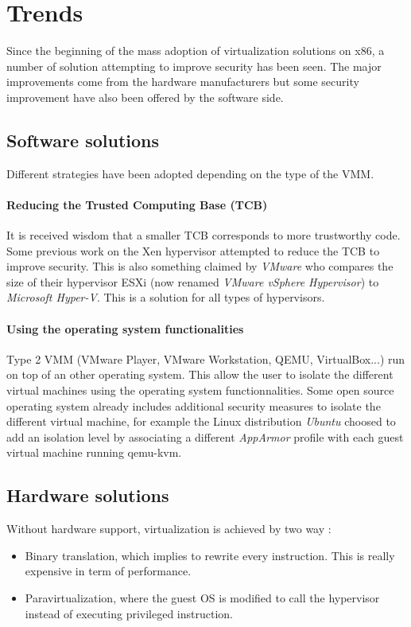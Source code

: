 \newpage
\section{Trends}
Since the beginning of the mass adoption of virtualization solutions on x86, a
number of solution attempting to improve security has been seen.
The major improvements come from the hardware manufacturers but some 
security improvement have also been offered by the software side.

\subsection{Software solutions}
Different strategies have been adopted depending on the type of the VMM.

\paragraph{Reducing the Trusted Computing Base (TCB)}
It is received wisdom that a smaller TCB corresponds to more trustworthy code.
Some previous work on the Xen\cite{xen} hypervisor attempted to reduce the
TCB\cite{xen-disaggregation} to
improve security.
This is also something claimed by \emph{VMware}\cite{vmware-footprint} who
compares the size of their hypervisor ESXi (now renamed \emph{VMware vSphere
Hypervisor}) to \emph{Microsoft Hyper-V}.
This is a solution for all types of hypervisors.

\paragraph{Using the operating system functionalities}
Type 2 VMM (VMware Player, VMware Workstation, QEMU, VirtualBox...) run on top
of an other operating system.
This allow the user to isolate the different virtual machines using the
operating system functionnalities.
Some open source operating system already includes additional security measures
to isolate the different virtual machine, for example the Linux distribution
\emph{Ubuntu}\cite{ubuntu} choosed to add an isolation level by associating a different
\emph{AppArmor}\cite{apparmor} profile with each guest virtual machine running
qemu-kvm.

\subsection{Hardware solutions}
Without hardware support, virtualization is achieved by two way :
\begin{itemize}
\item Binary translation, which implies to rewrite every instruction. This is
really expensive in term of performance.
\item Paravirtualization, where the guest OS is modified to call the hypervisor
instead of executing privileged instruction.
\end{itemize}

